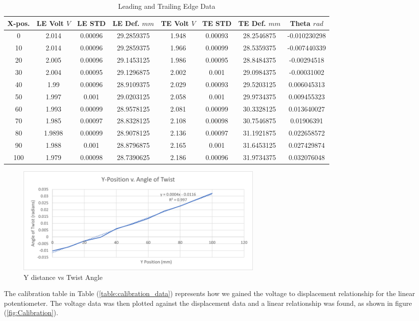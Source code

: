 \documentclass{article}
\begin{document}
\begin{table}[hbtp]
  \centering
  \begin{tabular}{|c|c|c|c|c|c|c|c|}
  \hline
  X-pos. & LE Volt \(V\) & LE STD & LE Def. \(mm\) & TE Volt \(V\) & TE STD & TE Def. \(mm\) & Theta \(rad\) \\
  \hline
  0 & 2.014 & 0.00096 & 29.2859375 & 1.948 & 0.00093 & 28.2546875 & -0.010230298 \\
  10 & 2.014 & 0.00096 & 29.2859375 & 1.966 & 0.00099 & 28.5359375 & -0.007440339 \\
  20 & 2.005 & 0.00096 & 29.1453125 & 1.986 & 0.00095 & 28.8484375 & -0.00294518 \\
  30 & 2.004 & 0.00095 & 29.1296875 & 2.002 & 0.001 & 29.0984375 & -0.00031002 \\
  40 & 1.99 & 0.00096 & 28.9109375 & 2.029 & 0.00093 & 29.5203125 & 0.006045313 \\
  50 & 1.997 & 0.001 & 29.0203125 & 2.058 & 0.001 & 29.9734375 & 0.009455323 \\
  60 & 1.993 & 0.00099 & 28.9578125 & 2.081 & 0.00099 & 30.3328125 & 0.013640027 \\
  70 & 1.985 & 0.00097 & 28.8328125 & 2.108 & 0.00098 & 30.7546875 & 0.01906391 \\
  80 & 1.9898 & 0.00099 & 28.9078125 & 2.136 & 0.00097 & 31.1921875 & 0.022658572 \\
  90 & 1.988 & 0.001 & 28.8796875 & 2.165 & 0.001 & 31.6453125 & 0.027429874 \\
  100 & 1.979 & 0.00098 & 28.7390625 & 2.186 & 0.00096 & 31.9734375 & 0.032076048 \\
  \hline
  \end{tabular}
  \caption{Leading and Trailing Edge Data}
  \label{tab:LE_TE_Data}
\end{table}

\begin{figure}[hbtp]
  \centering
  \includegraphics[width=0.6\textwidth]{lab3images/YvsTwist.png}
  \caption{Y distance vs Twist Angle}
  \label{fig:YvsTwist}
\end{figure}

The calibration table in Table (\ref{table:calibration_data}) represents how we gained the voltage to displacement relationship for the linear potentiometer.  The voltage data was then plotted against the displacement data and a linear relationship was found, as shown in figure (\ref{fig:Calibration}). 
\end{document}
